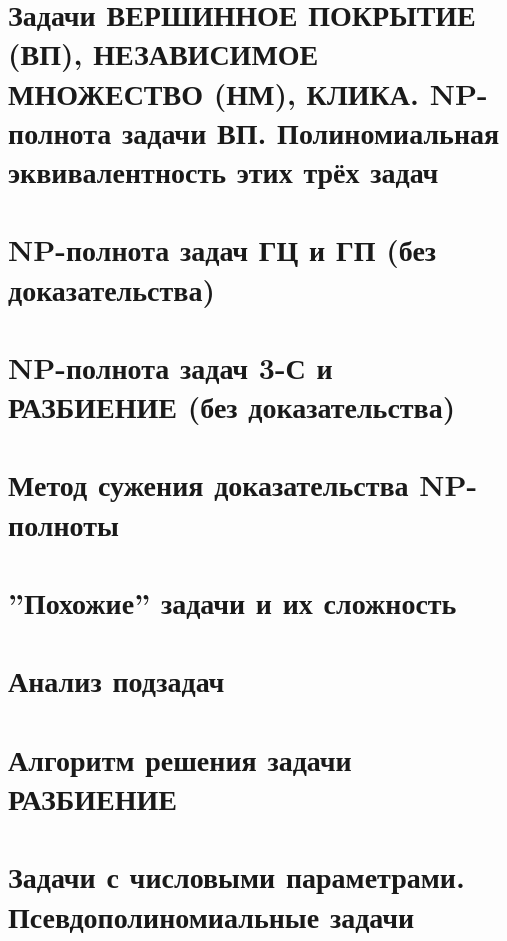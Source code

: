 \documentclass[40pt]{article}
\begin{document}
\section{Задачи ВЕРШИННОЕ ПОКРЫТИЕ (ВП), НЕЗАВИСИМОЕ МНОЖЕСТВО (НМ), КЛИКА.  NP-полнота задачи ВП.  Полиномиальная эквивалентность этих трёх задач}
\section{NP-полнота задач ГЦ и ГП (без доказательства)}
\section{NP-полнота задач 3-С и РАЗБИЕНИЕ (без доказательства)}
\section{Метод сужения доказательства NP-полноты}
\section{''Похожие'' задачи и их сложность}
\section{Анализ подзадач}
\section{Алгоритм решения задачи РАЗБИЕНИЕ}
\section{Задачи с числовыми параметрами. Псевдополиномиальные задачи}
\end{document}
